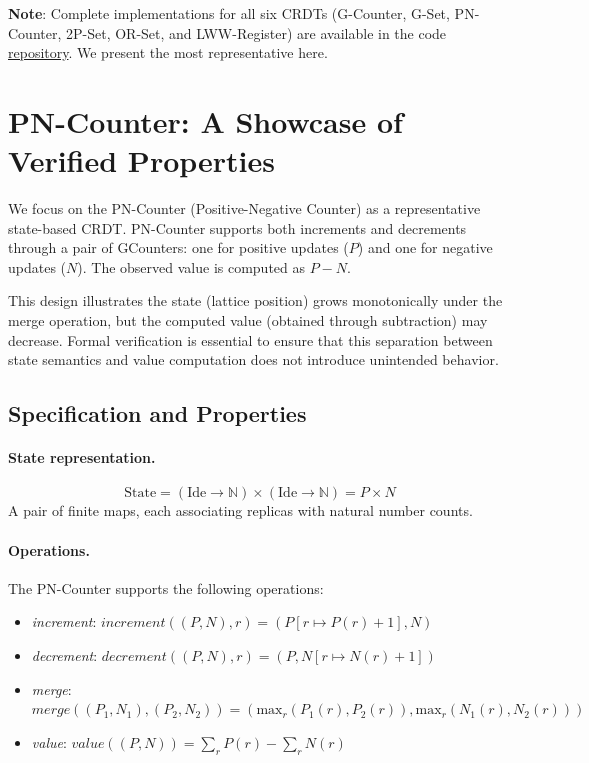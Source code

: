 \textbf{Note}: Complete implementations for all six CRDTs (G-Counter, G-Set, PN-Counter, 2P-Set, OR-Set, and LWW-Register) are available in the code \href{https://github.com/FLAGlab/Athena-CRDTs/tree/verified-implementation}{repository}. We present the most representative here.

\section{PN-Counter: A Showcase of Verified Properties}\label{sec:pncounter}

We focus on the PN-Counter (Positive-Negative Counter) as a representative state-based CRDT. PN-Counter supports both increments and decrements through a pair of GCounters: one for positive updates ($P$) and one for negative updates ($N$). The observed value is computed as $P - N$. 

This design illustrates the state (lattice position) grows monotonically under the merge operation, but the computed value (obtained through subtraction) may decrease. Formal verification is essential to ensure that this separation between state semantics and value computation does not introduce unintended behavior.
 
\subsection{Specification and Properties}

\paragraph{State representation.}
\[
\text{State} = (\text{Ide} \to \mathbb{N}) \times (\text{Ide} \to \mathbb{N}) = P \times N
\]
A pair of finite maps, each associating replicas with natural number counts.

\paragraph{Operations.} The PN-Counter supports the following operations:
\begin{itemize}
  \item \textit{increment}: $\mathit{increment}((P, N), r) = (P[r \mapsto P(r)+1], N)$
  \item \textit{decrement}: $\mathit{decrement}((P, N), r) = (P, N[r \mapsto N(r)+1])$
  \item \textit{merge}: $\mathit{merge}((P_1, N_1), (P_2, N_2)) = (\text{max}_r(P_1(r), P_2(r)), \text{max}_r(N_1(r), N_2(r)))$
  \item \textit{value}: $\mathit{value}((P, N)) = \sum_r P(r) - \sum_r N(r)$
\end{itemize}

